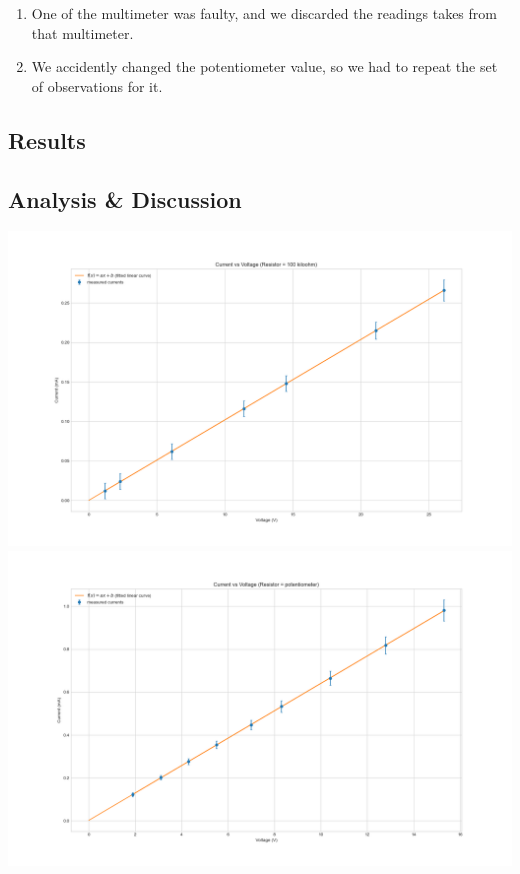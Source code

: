 \documentclass[letterpaper,12pt]{article}
\begin{document}
\begin{enumerate}
  \item One of the multimeter was faulty, and we discarded the readings takes from that multimeter.
  \item We accidently changed the potentiometer value, so we had to repeat the set of observations for it.
\end{enumerate}

\linebreak
{}

\subsection{Results}
\subsection{Analysis \& Discussion }

\begin{center}
    \includegraphics[width=1.0\linewidth]{../lab_1_ex_1_plot_100k.png}    
    \includegraphics[width=1.0\linewidth]{../lab_1_ex_1_plot_potentiometer.png}    
\end{center}
\end{document}
